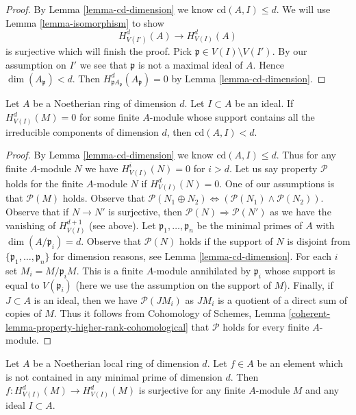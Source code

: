 \begin{proof}
By Lemma \ref{lemma-cd-dimension} we know $\text{cd}(A, I) \leq d$.
We will use Lemma \ref{lemma-isomorphism} to show
$$
H^d_{V(I')}(A) \to H^d_{V(I)}(A)
$$
is surjective which will finish the proof. Pick
$\mathfrak p \in V(I) \setminus V(I')$. By our assumption
on $I'$ we see that $\mathfrak p$ is not a maximal ideal of $A$.
Hence $\dim(A_\mathfrak p) < d$. Then
$H^d_{\mathfrak pA_\mathfrak p}(A_\mathfrak p) = 0$
by Lemma \ref{lemma-cd-dimension}.
\end{proof}

\begin{lemma}
\label{lemma-cd-top-vanishing-some-module}
Let $A$ be a Noetherian ring of dimension $d$. Let $I \subset A$
be an ideal. If $H^d_{V(I)}(M) = 0$ for some finite $A$-module
whose support contains all the irreducible components of
dimension $d$, then $\text{cd}(A, I) < d$.
\end{lemma}

\begin{proof}
By Lemma \ref{lemma-cd-dimension} we know $\text{cd}(A, I) \leq d$.
Thus for any finite $A$-module $N$ we have $H^i_{V(I)}(N) = 0$
for $i > d$. Let us say property $\mathcal{P}$ holds for the
finite $A$-module $N$ if $H^d_{V(I)}(N) = 0$.
One of our assumptions is that $\mathcal{P}(M)$ holds.
Observe that $\mathcal{P}(N_1 \oplus N_2)
\Leftrightarrow (\mathcal{P}(N_1) \wedge \mathcal{P}(N_2))$.
Observe that if $N \to N'$ is surjective, then
$\mathcal{P}(N) \Rightarrow \mathcal{P}(N')$ as we
have the vanishing of $H^{d + 1}_{V(I)}$ (see above).
Let $\mathfrak p_1, \ldots, \mathfrak p_n$ be the
minimal primes of $A$ with $\dim(A/\mathfrak p_i) = d$.
Observe that $\mathcal{P}(N)$ holds if the support
of $N$ is disjoint from $\{\mathfrak p_1, \ldots, \mathfrak p_n\}$
for dimension reasons, see Lemma \ref{lemma-cd-dimension}.
For each $i$ set $M_i = M/\mathfrak p_i M$.
This is a finite $A$-module annihilated by $\mathfrak p_i$
whose support is equal to
$V(\mathfrak p_i)$ (here we use the assumption on the support of $M$).
Finally, if $J \subset A$ is an ideal, then we have $\mathcal{P}(JM_i)$
as $JM_i$ is a quotient of a direct sum of copies of $M$.
Thus it follows from Cohomology of Schemes, Lemma
\ref{coherent-lemma-property-higher-rank-cohomological}
that $\mathcal{P}$ holds for every finite $A$-module.
\end{proof}

\begin{lemma}
\label{lemma-top-coh-divisible}
Let $A$ be a Noetherian local ring of dimension $d$. Let $f \in A$
be an element which is not contained in any minimal prime of
dimension $d$. Then $f : H^d_{V(I)}(M) \to H^d_{V(I)}(M)$
is surjective for any finite $A$-module $M$ and any ideal $I \subset A$.
\end{lemma}

